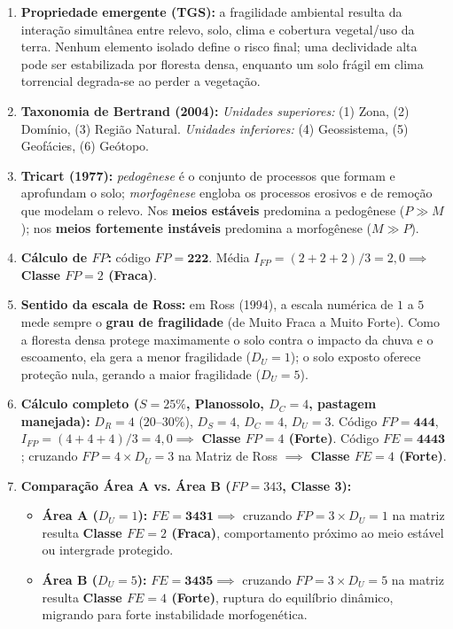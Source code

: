 \begin{boxGabarito}
\begin{enumerate}[leftmargin=1.8em, itemsep=3.5pt]
  \item \textbf{Propriedade emergente (TGS):} a fragilidade ambiental resulta da interação simultânea entre relevo, solo, clima e cobertura vegetal/uso da terra. Nenhum elemento isolado define o risco final; uma declividade alta pode ser estabilizada por floresta densa, enquanto um solo frágil em clima torrencial degrada-se ao perder a vegetação.

  \item \textbf{Taxonomia de Bertrand (2004):} \emph{Unidades superiores:} (1) Zona, (2) Domínio, (3) Região Natural. \emph{Unidades inferiores:} (4) Geossistema, (5) Geofácies, (6) Geótopo.

  \item \textbf{Tricart (1977):} \emph{pedogênese} é o conjunto de processos que formam e aprofundam o solo; \emph{morfogênese} engloba os processos erosivos e de remoção que modelam o relevo. Nos \textbf{meios estáveis} predomina a pedogênese ($P \gg M$); nos \textbf{meios fortemente instáveis} predomina a morfogênese ($M \gg P$).

  \item \textbf{Cálculo de $FP$:} código $FP = \mathbf{222}$. Média $I_{FP} = (2+2+2)/3 = 2{,}0 \implies$ \textbf{Classe $FP = 2$ (Fraca)}.

  \item \textbf{Sentido da escala de Ross:} em Ross (1994), a escala numérica de $1$ a $5$ mede sempre o \textbf{grau de fragilidade} (de Muito Fraca a Muito Forte). Como a floresta densa protege maximamente o solo contra o impacto da chuva e o escoamento, ela gera a menor fragilidade ($D_U = 1$); o solo exposto oferece proteção nula, gerando a maior fragilidade ($D_U = 5$).

  \item \textbf{Cálculo completo ($S=25\%$, Planossolo, $D_C=4$, pastagem manejada):} $D_R=4$ ($20\text{--}30\%$), $D_S=4$, $D_C=4$, $D_U=3$. Código $FP = \mathbf{444}$, $I_{FP} = (4+4+4)/3 = 4{,}0 \implies$ \textbf{Classe $FP = 4$ (Forte)}. Código $FE = \mathbf{4443}$; cruzando $FP=4 \times D_U=3$ na Matriz de Ross $\implies$ \textbf{Classe $FE = 4$ (Forte)}.

  \item \textbf{Comparação Área A vs. Área B ($FP = 343$, Classe 3):}
  \begin{itemize}[leftmargin=1.4em, itemsep=1pt]
    \item \textbf{Área A ($D_U=1$):} $FE = \mathbf{3431} \implies$ cruzando $FP=3 \times D_U=1$ na matriz resulta \textbf{Classe $FE = 2$ (Fraca)}, comportamento próximo ao meio estável ou intergrade protegido.
    \item \textbf{Área B ($D_U=5$):} $FE = \mathbf{3435} \implies$ cruzando $FP=3 \times D_U=5$ na matriz resulta \textbf{Classe $FE = 4$ (Forte)}, ruptura do equilíbrio dinâmico, migrando para forte instabilidade morfogenética.
  \end{itemize}


\end{enumerate}
\end{boxGabarito}

